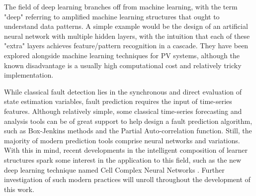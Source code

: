 The field of deep learning branches off from machine learning, with the term "deep" referring to amplified machine learning structures that ought to understand data patterns. A simple example would be the design of an artificial neural network with multiple hidden layers, with the intuition that each of these "extra" layers achieves feature/pattern recognition in a cascade. They have been explored alongside machine learning techniques for PV systems, although the known disadvantage is a usually high computational cost and relatively tricky implementation.


While classical fault detection lies in the synchronous and direct evaluation of state estimation variables, fault prediction requires the input of time-series features. Although relatively simple, some classical time-series forecasting and analysis tools can be of great support to help design a fault prediction algorithm, such as Box-Jenkins methods and the Partial Auto-correlation function. Still, the majority of modern prediction tools comprise neural networks and variations. With this in mind, recent developments in the intelligent composition of learner structures spark some interest in the application to this field, such as the new deep learning technique named Cell Complex Neural Networks \cite{Hajij2020}. Further investigation of such modern practices will unroll throughout the development of this work.

